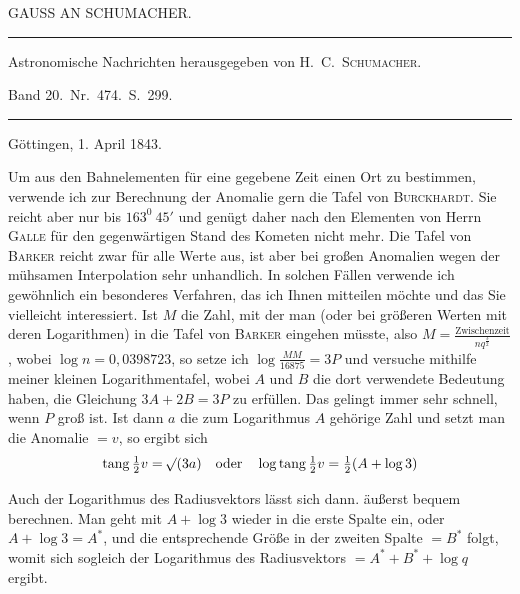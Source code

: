 \clearpage{}%
\begin{center}
{\small GAUSS AN SCHUMACHER.\par}
\medskip\hrule\medskip
{\small Astronomische Nachrichten herausgegeben von H.\ C.\ \textsc{Schumacher}.\par
Band 20.\ Nr.\ 474.\ S.\ 299.\par}
\medskip\hrule
\end{center}\medskip
\begin{flushright}Göttingen, 1. April 1843.\end{flushright}
Um aus den Bahnelementen für eine gegebene Zeit einen Ort zu bestimmen, verwende ich zur Berechnung der Anomalie gern die Tafel von \textsc{Burckhardt}. Sie reicht aber nur bis $163^0\ 45'$ und genügt daher nach den Elementen von Herrn \textsc{Galle} für den gegenwärtigen Stand des Kometen nicht mehr. Die Tafel von \textsc{Barker} reicht zwar für alle Werte aus, ist aber bei großen Anomalien wegen der mühsamen Interpolation sehr unhandlich. In solchen Fällen verwende ich gewöhnlich ein besonderes Verfahren, das ich Ihnen mitteilen möchte und das Sie vielleicht interessiert. Ist $M$ die Zahl, mit der man (oder bei größeren Werten mit deren Logarithmen) in die Tafel von \textsc{Barker} eingehen müsste, also $M=\frac{\text{Zwischenzeit}}{nq^{\frac32}}$, wobei $\log n=0{,}0398723$, so setze ich $\log\frac{MM}{16875}=3P$ und versuche mithilfe meiner kleinen Logarithmentafel, wobei $A$ und $B$ die dort verwendete Bedeutung haben, die Gleichung $3A+2B=3P$ zu erfüllen. Das gelingt immer sehr schnell, wenn $P$ groß ist. Ist dann $a$ die zum Logarithmus $A$ gehörige Zahl und setzt man die Anomalie $=v$, so ergibt sich
\[
\operatorname{tang}\tfrac12v=\mathord{{}^{}\!\surd}(3a)\quad\text{oder}\quad
\log\operatorname{tang}\tfrac12v=\tfrac12(A+\log3)
\]

Auch der Logarithmus des Radiusvektors lässt sich dann. äußerst bequem berechnen. Man geht mit $A+\log3$ wieder in die erste Spalte ein, oder $A+\log3=A^*$, und die entsprechende Größe in der zweiten Spalte $=B^*$ folgt, womit sich sogleich der Logarithmus des Radiusvektors $=A^*+B^*+\log q$ ergibt.

